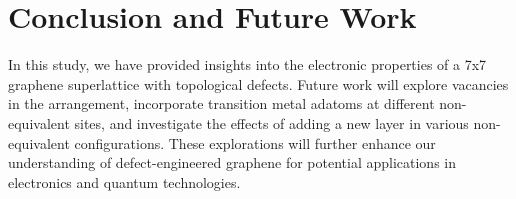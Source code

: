 \documentclass{article}
\begin{document}
\section{Conclusion and Future Work}
In this study, we have provided insights into the electronic properties of a 7x7 graphene superlattice with topological defects. Future work will explore vacancies in the arrangement, incorporate transition metal adatoms at different non-equivalent sites, and investigate the effects of adding a new layer in various non-equivalent configurations. These explorations will further enhance our understanding of defect-engineered graphene for potential applications in electronics and quantum technologies.



\end{document}
